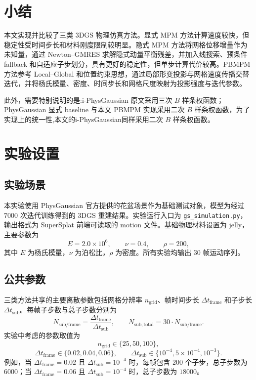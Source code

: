 \documentclass[a4paper]{article}
\begin{document}
\section{小结}
本文实现并比较了三类 3DGS 物理仿真方法。显式 MPM 方法计算速度较快，但稳定性受时间步长和材料刚度限制较明显。隐式 MPM 方法将网格位移增量作为未知量，通过 Newton--GMRES 求解隐式动量平衡残差，并加入线搜索、预条件 fallback 和自适应子步划分，具有更好的稳定性，但单步计算代价较高。PBMPM 方法参考 Local--Global 和位置约束思想，通过局部形变投影与网格速度传播交替迭代，并将杨氏模量、密度、时间步长和网格尺度映射为投影强度与迭代参数。

此外，需要特别说明的是:i-PhysGaussian 原文采用三次 $B$ 样条权函数；PhysGaussian 显式 baseline 与本文 PBMPM 实现采用二次 $B$ 样条权函数，为了实现上的统一性,本文的i-PhysGaussian同样采用二次 $B$ 样条权函数。

\section{实验设置}

\subsection{实验场景}

本实验使用 PhysGaussian 官方提供的花盆场景作为基础测试对象，模型为经过 $7000$ 次迭代训练得到的 3DGS 重建结果。实验运行入口为 \texttt{gs\_simulation.py}，输出格式为 SuperSplat 前端可读取的 motion 文件。基础物理材料设置为 jelly，主要参数为
\[
    E=2.0\times 10^6,\qquad
    \nu=0.4,\qquad
    \rho=200,
\]
其中 $E$ 为杨氏模量，$\nu$ 为泊松比，$\rho$ 为密度。所有实验均输出 $30$ 帧运动序列。

\subsection{公共参数}

三类方法共享的主要离散参数包括网格分辨率 $n_{\mathrm{grid}}$、帧时间步长 $\Delta t_{\mathrm{frame}}$ 和子步长 $\Delta t_{\mathrm{sub}}$。每帧子步数与总子步数分别为
\[
    N_{\mathrm{sub/frame}}
    =
    \frac{\Delta t_{\mathrm{frame}}}{\Delta t_{\mathrm{sub}}},
    \qquad
    N_{\mathrm{sub,total}}
    =
    30
    \cdot
    N_{\mathrm{sub/frame}}.
\]
实验中考虑的参数取值为
\[
    n_{\mathrm{grid}}\in\{25,50,100\},
\]
\[
    \Delta t_{\mathrm{frame}}\in\{0.02,0.04,0.06\},
    \qquad
    \Delta t_{\mathrm{sub}}\in\{10^{-4},5\times10^{-4},10^{-3}\}.
\]
例如，当 $\Delta t_{\mathrm{frame}}=0.02$ 且 $\Delta t_{\mathrm{sub}}=10^{-4}$ 时，每帧包含 $200$ 个子步，总子步数为 $6000$；当 $\Delta t_{\mathrm{frame}}=0.06$ 且 $\Delta t_{\mathrm{sub}}=10^{-4}$ 时，总子步数为 $18000$。
\end{document}
